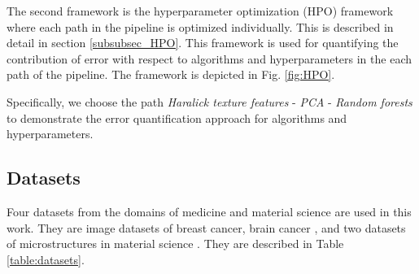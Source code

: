 The second framework is the hyperparameter optimization (HPO) framework where each path in the pipeline is optimized individually. This is described in detail in section \ref{subsubsec_HPO}. This framework is used for quantifying the contribution of error with respect to algorithms and hyperparameters in the each path of the pipeline. The framework is depicted in Fig. \ref{fig:HPO}.

Specifically, we choose the path \textit{Haralick texture features} - \textit{PCA} - \textit{Random forests} to demonstrate the error quantification approach for algorithms and hyperparameters.

\subsection{Datasets}
Four datasets from the domains of medicine and material science are used in this work. They are image datasets of breast cancer\cite{bilgin2007cell}, brain cancer \cite{gunduz2004cell}, and two datasets of microstructures in material science \cite{chowdhury2016image}. They are described in Table \ref{table:datasets}.


